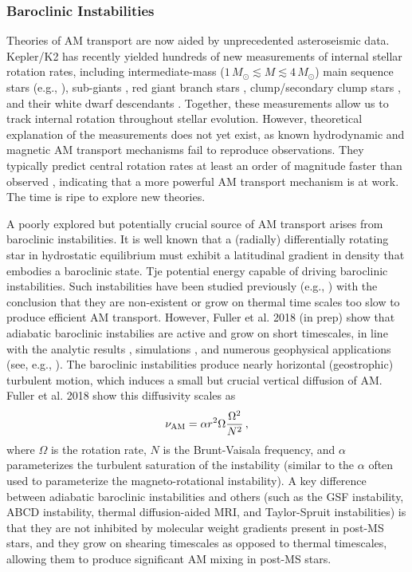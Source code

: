 \subsubsection{Baroclinic Instabilities}
\label{baroclinic}


Theories of AM transport are now aided by unprecedented asteroseismic data. Kepler/K2 has recently yielded hundreds of new measurements of internal stellar rotation rates, including intermediate-mass ($1 \, M_\odot \! \lesssim \! M \! \lesssim \! 4 \, M_\odot$) main sequence stars (e.g., \citealt{benomar:15,vanreeth:16}), sub-giants \citep{deheuvels:14}, red giant branch stars \citep{beck:12,mosser:12}, clump/secondary clump stars \citep{mosser:12,deheuvels:15}, and their white dwarf descendants \citep{hermes:17}. Together, these measurements allow us to track internal rotation throughout stellar evolution. However, theoretical explanation of the measurements does not yet exist, as known hydrodynamic and magnetic AM transport mechanisms fail to reproduce observations. They typically predict central rotation rates at least an order of magnitude faster than observed \citep{cantiello:14}, indicating that a more powerful AM transport mechanism is at work. The time is ripe to explore new theories.

A poorly explored but potentially crucial source of AM transport arises from baroclinic instabilities. It is well known that a (radially) differentially rotating star in hydrostatic equilibrium must exhibit a latitudinal gradient in density that embodies a baroclinic state. Tje  potential energy capable of driving baroclinic instabilities. Such instabilities have been studied previously (e.g., \citealt{goldreich:67,knobloch:82,knobloch:83,spruit:83,spruit:84,zahn:93}) with the conclusion that they are non-existent or grow on thermal time scales too slow to produce efficient AM transport. However, Fuller et al. 2018 (in prep) show that adiabatic baroclinic instabilies are active and grow on short timescales, in line with the analytic results \citep{tassoul:82,fujimoto:87,fujimoto:88}, simulations \cite{simitev:17}, and numerous geophysical applications (see, e.g., \citealt{pedlosky:92}). The baroclinic instabilities produce nearly horizontal (geostrophic) turbulent motion, which induces a small but crucial vertical diffusion of AM. Fuller et al. 2018 show this diffusivity scales as
\begin{equation}
\label{numri} 
\nu_{\rm AM} = \alpha r^2 \Omega \frac{\Omega^2}{N^2} \, ,
\end{equation}
where $\Omega$ is the rotation rate, $N$ is the Brunt-Vaisala frequency, and $\alpha$ parameterizes the turbulent saturation of the instability (similar to the $\alpha$ often used to parameterize the magneto-rotational instability). A key difference between adiabatic baroclinic instabilities and others (such as the GSF instability, ABCD instability, thermal diffusion-aided MRI, and Taylor-Spruit instabilities) is that they are not inhibited by molecular weight gradients present in post-MS stars, and they grow on shearing timescales as opposed to thermal timescales, allowing them to produce significant AM mixing in post-MS stars.




